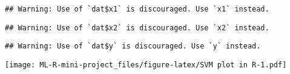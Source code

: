 \documentclass[
]{article}
\begin{document}
\begin{verbatim}
## Warning: Use of `dat$x1` is discouraged. Use `x1` instead.
\end{verbatim}

\begin{verbatim}
## Warning: Use of `dat$x2` is discouraged. Use `x2` instead.
\end{verbatim}

\begin{verbatim}
## Warning: Use of `dat$y` is discouraged. Use `y` instead.
\end{verbatim}

\texttt{[image: ML-R-mini-project\_files/figure-latex/SVM plot in R-1.pdf]}
\end{document}
